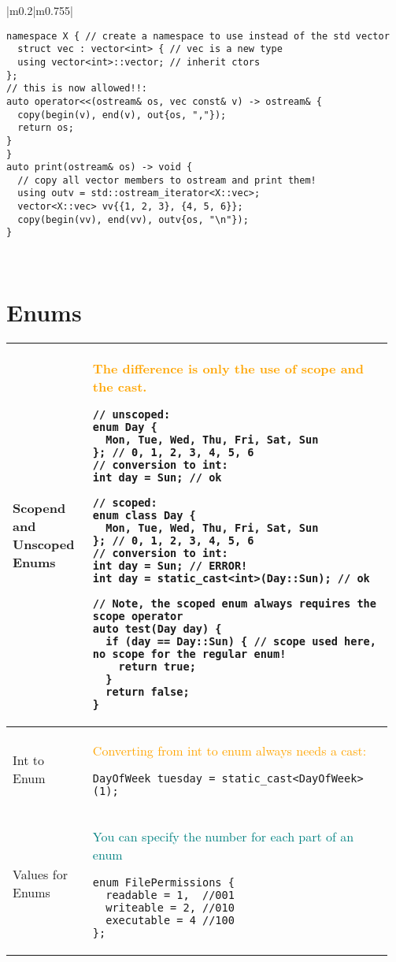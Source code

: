 \documentclass[main.tex,fontsize=8pt,paper=a4,paper=portrait,DIV=calc]{scrartcl}
\begin{document}
\begin{table}[ht!]
\begin{tabular}{|m{0.2\linewidth}|m{0.755\linewidth}|}
\begin{lstlisting}
namespace X { // create a namespace to use instead of the std vector
  struct vec : vector<int> { // vec is a new type
  using vector<int>::vector; // inherit ctors
};
// this is now allowed!!:
auto operator<<(ostream& os, vec const& v) -> ostream& { 
  copy(begin(v), end(v), out{os, ","});
  return os;
}
}
auto print(ostream& os) -> void {
  // copy all vector members to ostream and print them!
  using outv = std::ostream_iterator<X::vec>;
  vector<X::vec> vv{{1, 2, 3}, {4, 5, 6}};
  copy(begin(vv), end(vv), outv{os, "\n"});
}
\end{lstlisting}\\
\hline
\end{tabular}
\section{Enums}
\begin{tabular}{|m{0.2\linewidth}|m{0.755\linewidth}|}
\hline
Scopend and Unscoped Enums &
\textcolor{orange}{The difference is only the use of scope and the cast.}\newline
\begin{lstlisting}
// unscoped:
enum Day { 
  Mon, Tue, Wed, Thu, Fri, Sat, Sun
}; // 0, 1, 2, 3, 4, 5, 6
// conversion to int:
int day = Sun; // ok

// scoped:
enum class Day { 
  Mon, Tue, Wed, Thu, Fri, Sat, Sun
}; // 0, 1, 2, 3, 4, 5, 6
// conversion to int:
int day = Sun; // ERROR!
int day = static_cast<int>(Day::Sun); // ok

// Note, the scoped enum always requires the scope operator
auto test(Day day) {
  if (day == Day::Sun) { // scope used here, no scope for the regular enum!
    return true;
  }
  return false;
}
\end{lstlisting}\\
\hline
Int to Enum & 
\textcolor{orange}{Converting from int to enum always needs a cast:}\newline
\begin{lstlisting}
DayOfWeek tuesday = static_cast<DayOfWeek>(1);
\end{lstlisting}\\
\hline
Values for Enums &
\textcolor{teal}{You can specify the number for each part of an enum}\newline
\begin{lstlisting}
enum FilePermissions {
  readable = 1,  //001
  writeable = 2, //010
  executable = 4 //100
};
\end{lstlisting}\\
\hline
\end{tabular}
\end{table}
\end{document}
